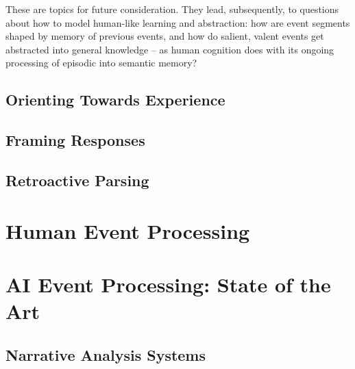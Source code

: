 \documentclass[11pt,a4paper]{article}
\begin{document}
These are topics for future consideration. They lead, subsequently, to questions about how to model human-like learning and abstraction: how are event segments shaped by memory of previous events, and how do salient, valent events get abstracted into general knowledge -- as human cognition does with its ongoing processing of episodic into semantic memory?

\subsection{Orienting Towards Experience}


\subsection{Framing Responses}


\subsection{Retroactive Parsing}


\section{Human Event Processing}
\label{sec:human-processing}


\section{AI Event Processing: State of the Art}
\label{sec:ai-processing}


\subsection{Narrative Analysis Systems}

\end{document}
